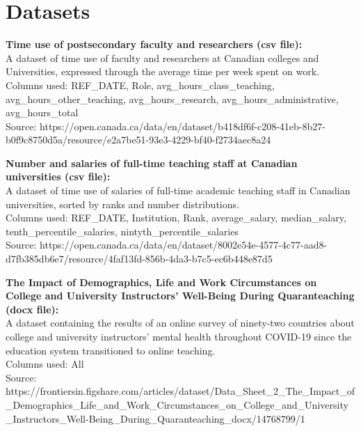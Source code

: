 \documentclass{article}
\begin{document}
\section{Datasets}
\begin{flushleft}
\textbf{Time use of postsecondary faculty and researchers (csv file):}\\
A dataset of time use of faculty and researchers at Canadian colleges and Universities, expressed through the average time per week spent on work.\\
Columns used: REF\_DATE, Role, avg\_hours\_class\_teaching, avg\_hours\_other\_teaching, avg\_hours\_research, avg\_hours\_administrative, avg\_hours\_total\\
Source: https://open.canada.ca/data/en/dataset/b418df6f-c208-41eb-8b27-b0f9c8750d5a/resource/e2a7be51-93e3-4229-bf40-f2734aec8a24\hfill \break

\textbf{Number and salaries of full-time teaching staff at Canadian universities (csv file):}\\
A dataset of time use of salaries of full-time academic teaching staff in Canadian universities, sorted by ranks and number distributions.\\
Columns used: REF\_DATE, Institution, Rank, average\_salary, median\_salary, tenth\_percentile\_salaries, nintyth\_percentile\_salaries\\
Source: https://open.canada.ca/data/en/dataset/8002e54e-4577-4c77-aad8-d7fb385db6e7/resource/4faf13fd-856b-4da3-b7c5-ec6b448e87d5\hfill \break

\textbf{The Impact of Demographics, Life and Work Circumstances on College and University Instructors' Well-Being During Quaranteaching (docx file):}\\
A dataset containing the results of an online survey of ninety-two countries about college and university instructors' mental health throughout COVID-19 since the education system transitioned to online teaching.\\
Columns used: All\\
Source: https://frontiersin.figshare.com/articles/dataset/Data\_Sheet\_2\_The\_Impact\_of\\
\_Demographics\_Life\_and\_Work\_Circumstances\_on\_College\_and\_University\\
\_Instructors\_Well-Being\_During\_Quaranteaching\_docx/14768799/1
\end{flushleft}
\end{document}
